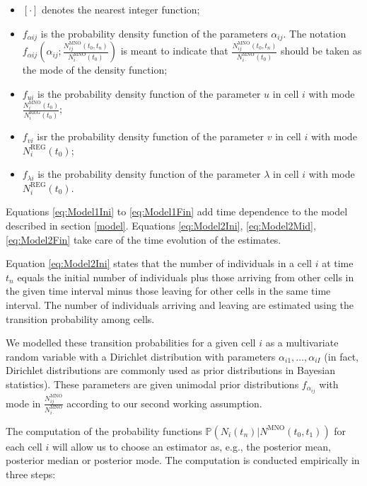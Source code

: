 \documentclass[12pt, a4paper]{article}
\begin{document}
\begin{itemize}
	\item $[\cdot]$ denotes the nearest integer function;
	\item $f_{\alpha ij}$ is the probability density function of the parameters $\alpha_{ij}$. The 
	notation $f_{\alpha ij}\left(\alpha_{ij}; \frac{N_{ij}^{\textrm{MNO}}(t_{0}, t_{n})}{N_{i\cdot}^{\textrm{MNO}}(t_{0})}\right)$ is meant to 
	indicate that $\frac{N_{ij}^{\textrm{MNO}}(t_{0}, t_{n})}{N_{i\cdot}^{\textrm{MNO}}(t_{0})}$ should be taken as the mode of the density function;
	\item $f_{ui}$ is the probability density function of the parameter $u$ in cell $i$ with mode $\frac{N_{i}^{\textrm{MNO}}(t_{0})}{N_{i}^{\textrm{REG}}(t_{0})}$;
	\item $f_{vi}$ isr the probability density function of the parameter $v$  in cell $i$ with mode $N_{i}^{\textrm{REG}}(t_{0})$;
	\item $f_{\lambda i}$ is the probability density function of the parameter $\lambda$ in cell $i$ with mode $N_{i}^{\textrm{REG}}(t_{0})$. 
\end{itemize}


Equations \eqref{eq:Model1Ini} to \eqref{eq:Model1Fin} add time dependence to the model described 
in section \ref{model}. Equations \eqref{eq:Model2Ini}, \eqref{eq:Model2Mid}, \eqref{eq:Model2Fin} 
take care of the time evolution of the estimates.

Equation \eqref{eq:Model2Ini} states that the number of individuals in a cell $i$ at time $t_{n}$ equals 
the initial number of individuals plus those arriving from other cells in the given time interval minus those 
leaving for other cells in the same time interval. The number of individuals arriving and leaving 
are estimated using the transition probability among cells.

We modelled these transition probabilities for a given cell $i$ as a multivariate random variable with 
a Dirichlet distribution with parameters $\alpha_{i1},\dots,\alpha_{iI}$ (in fact, Dirichlet distributions 
are commonly used as prior distributions in Bayesian statistics). These parameters  are given unimodal 
prior distributions $f_{\alpha_{ij}}$ with mode in $\frac{N_{ij}^{\textrm{MNO}}}{N_{i\cdot}^{\textrm{MNO}}}$ according to 
our second working assumption.

The computation of the probability functions $\mathbb{P}\left(N_{i}(t_{n})\big|N^{\textrm{MNO}}(t_{0}, t_{1})\right)$ for 
each cell $i$ will allow us to choose an estimator as, e.g., the posterior mean, posterior median or 
posterior mode. The computation is conducted empirically in three steps:
\end{document}
